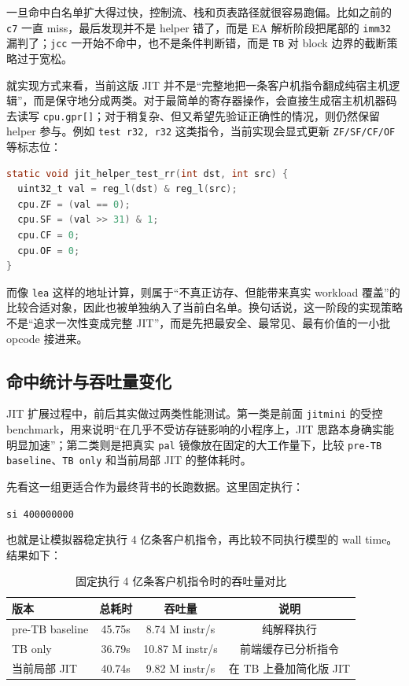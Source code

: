 \documentclass[a4paper]{article}
\begin{document}
一旦命中白名单扩大得过快，控制流、栈和页表路径就很容易跑偏。比如之前的 \texttt{c7} 一直 miss，最后发现并不是 helper 错了，而是 EA 解析阶段把尾部的 \texttt{imm32} 漏判了；\texttt{jcc} 一开始不命中，也不是条件判断错，而是 \texttt{TB} 对 block 边界的截断策略过于宽松。

就实现方式来看，当前这版 JIT 并不是“完整地把一条客户机指令翻成纯宿主机逻辑”，而是保守地分成两类。对于最简单的寄存器操作，会直接生成宿主机机器码去读写 \texttt{cpu.gpr[]}；对于稍复杂、但又希望先验证正确性的情况，则仍然保留 helper 参与。例如 \texttt{test r32, r32} 这类指令，当前实现会显式更新 \texttt{ZF/SF/CF/OF} 等标志位：

\begin{lstlisting}[language=C]
static void jit_helper_test_rr(int dst, int src) {
  uint32_t val = reg_l(dst) & reg_l(src);
  cpu.ZF = (val == 0);
  cpu.SF = (val >> 31) & 1;
  cpu.CF = 0;
  cpu.OF = 0;
}
\end{lstlisting}

而像 \texttt{lea} 这样的地址计算，则属于“不真正访存、但能带来真实 workload 覆盖”的比较合适对象，因此也被单独纳入了当前白名单。换句话说，这一阶段的实现策略不是“追求一次性变成完整 JIT”，而是先把最安全、最常见、最有价值的一小批 opcode 接进来。

\subsection{命中统计与吞吐量变化}
JIT 扩展过程中，前后其实做过两类性能测试。第一类是前面 \texttt{jitmini} 的受控 benchmark，用来说明“在几乎不受访存链影响的小程序上，JIT 思路本身确实能明显加速”；第二类则是把真实 \texttt{pal} 镜像放在固定的大工作量下，比较 \texttt{pre-TB baseline}、\texttt{TB only} 和当前局部 JIT 的整体耗时。

先看这一组更适合作为最终背书的长跑数据。这里固定执行：

\begin{center}
\texttt{si 400000000}
\end{center}

也就是让模拟器稳定执行 4 亿条客户机指令，再比较不同执行模型的 wall time。结果如下：

\begin{table}[H]
  \centering
  \begin{tabular}{lccc}
    \toprule
    版本 & 总耗时 & 吞吐量 & 说明 \\
    \midrule
    pre-TB baseline & 45.75s & 8.74 M instr/s & 纯解释执行 \\
    TB only & 36.79s & 10.87 M instr/s & 前端缓存已分析指令 \\
    当前局部 JIT & 40.74s & 9.82 M instr/s & 在 TB 上叠加简化版 JIT \\
    \bottomrule
  \end{tabular}
  \caption{固定执行 4 亿条客户机指令时的吞吐量对比}
\end{table}
\end{document}
